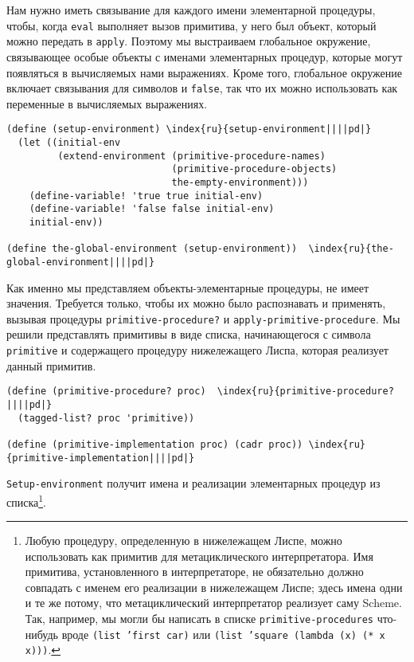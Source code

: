 Нам нужно иметь связывание для каждого имени элементарной
процедуры, чтобы, когда {\tt eval} выполняет вызов примитива, у
него был объект, который можно передать в {\tt apply}.  Поэтому
мы выстраиваем 
глобальное окружение,
связывающее особые объекты с именами элементарных процедур, которые
могут появляться в вычисляемых 
нами выражениях.  Кроме того, глобальное окружение включает связывания
для символов 
 и {\tt false}, так что их можно
использовать как переменные в вычисляемых выражениях.

\begin{Verbatim}[fontsize=\small]
(define (setup-environment) \index{ru}{setup-environment||||pd|}
  (let ((initial-env
         (extend-environment (primitive-procedure-names)
                             (primitive-procedure-objects)
                             the-empty-environment)))
    (define-variable! 'true true initial-env)
    (define-variable! 'false false initial-env)
    initial-env))

(define the-global-environment (setup-environment))  \index{ru}{the-global-environment||||pd|}
\end{Verbatim}

Как именно мы представляем объекты-элементарные процедуры,
не имеет значения.  Требуется только, чтобы их можно было распознавать
и применять, вызывая процедуры
{\tt primitive-procedure?} и
{\tt apply-primitive-procedure}. Мы решили представлять
примитивы в виде списка, начинающегося с символа
{\tt primitive} и содержащего процедуру нижележащего Лиспа,
которая реализует данный примитив.

\begin{Verbatim}[fontsize=\small]
(define (primitive-procedure? proc)  \index{ru}{primitive-procedure?||||pd|}
  (tagged-list? proc 'primitive))

(define (primitive-implementation proc) (cadr proc)) \index{ru}{primitive-implementation||||pd|}
\end{Verbatim}

{\tt Setup-environment} получит имена и реализации
элементарных процедур из списка\footnote{Любую процедуру, 
определенную в нижележащем Лиспе, можно
использовать как примитив для метациклического интерпретатора.  Имя
примитива, установленного в интерпретаторе, не обязательно должно
совпадать с именем его реализации в нижележащем Лиспе; здесь имена
одни и те же потому, что метациклический интерпретатор реализует саму
Scheme.  Так, например, мы могли бы написать в списке
{\tt primitive-procedures} что-нибудь вроде {\tt (list 'first
car)} или {\tt (list 'square (lambda (x) (* x x)))}.}.

